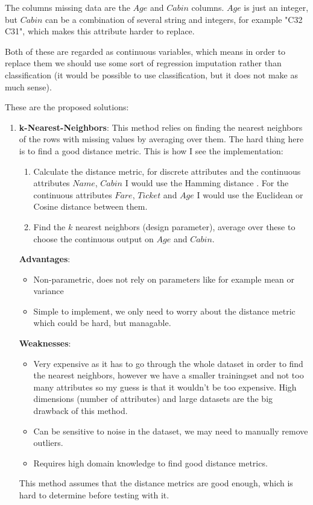 \documentclass[11pt, english]{../Template/NTNUoving}
\begin{document}
\begin{oppgave}

    The columns missing data are the $Age$ and $Cabin$ columns.
    $Age$ is just an integer, but $Cabin$ can be a combination of several
    string and integers, for example "C32 C31", which makes this attribute harder to replace.

    Both of these are regarded as continuous variables, which means in order to replace them we should use some sort of
    regression imputation rather than classification (it would be possible to use classification, but it does not make as much sense).

    These are the proposed solutions:

    \begin{enumerate}

        \item \textbf{k-Nearest-Neighbors}\cite{knn}: This method relies on finding the nearest neighbors of the rows with missing values by averaging over them. The hard thing here is to find a good distance metric.
        This is how I see the implementation:
        \begin{enumerate}[label=\arabic*]
            \item Calculate the distance metric, for discrete attributes and the continuous attributes $Name$, $Cabin$ I would use the Hamming distance \cite{hamming}. For the continuous attributes $Fare$, $Ticket$ and $Age$ I would use the Euclidean or Cosine distance between them.
            \item Find the $k$ nearest neighbors (design parameter), average over these to choose the continuous output on $Age$ and $Cabin$.
        \end{enumerate}
        \textbf{Advantages}:
        \begin{itemize}
            \item Non-parametric, does not rely on parameters like for example mean or variance
            \item Simple to implement, we only need to worry about the distance metric which could be hard, but managable.
        \end{itemize}
        \textbf{Weaknesses}:
        \begin{itemize}
            \item Very expensive as it has to go through the whole dataset in order to find the nearest neighbors, however we have a smaller trainingset and not too many attributes so my guess is that it wouldn't be too expensive.
            High dimensions (number of attributes) and large datasets are the big drawback of this method.
            \item Can be sensitive to noise in the dataset, we may need to manually remove outliers.
            \item Requires high domain knowledge to find good distance metrics.
        \end{itemize}
        This method assumes that the distance metrics are good enough, which is hard to determine before testing with it.


\end{enumerate}
\end{oppgave}
\end{document}
